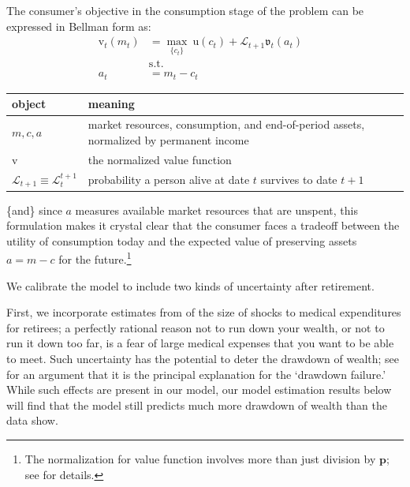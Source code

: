 \documentclass{article}
\newcommand{\uFunc}{\mathrm{u}}
\newcommand{\pLvl}{\mathbf{p}}
\newcommand{\vFunc}{\mathrm{v}}
\newcommand{\Alive}{\mathcal{L}}
\newcommand{\tranShkEmp}{\xi}
\newcommand{\cNrm}{c}
\newcommand{\RNrm}{\mathcal{R}}
\newcommand{\aNrm}{a}
\newcommand{\mNrm}{m}
\begin{document}
The consumer's objective in the consumption stage of the problem can be expressed in Bellman form as:
\begin{align}
    {\vFunc}_{t}({\mNrm}_{t}) & = \max_{\{\cNrm_{t}\}} ~ \uFunc(\cNrm_{t})+\Alive_{t+1} \mathfrak{v}_{t}(\aNrm_{t})
    \\ & \text{s.t.} &
    \\ \aNrm_{t} & = {\mNrm}_{t}-\cNrm_{t}
\end{align}

\newline
\bigskip\noindent
\begin{tabular}{p{}p{}}
\toprule
object & meaning \\
\hline
$\mNrm, \cNrm, \aNrm$ & market resources, consumption, and end-of-period assets, normalized by permanent income \\
$\vFunc$ & the normalized value function \\
$\Alive_{t+1} \equiv \Alive_{t}^{t+1}$ & probability a person alive at date $t$ survives to date $t+1$ \\
\bottomrule
\end{tabular}

\bigskip\newline
\{and\} since $\aNrm$ measures available market resources that are unspent, this formulation makes it crystal clear that the consumer faces a tradeoff between the utility of consumption today and the expected value of preserving assets $\aNrm=\mNrm -\cNrm$ for the future.\footnote{The normalization for value function involves more than just division by $\pLvl$; see \cite{BufferStockTheory} for details.}

We calibrate the model to include two kinds of uncertainty after retirement.

First, we incorporate estimates from \cite{velasquez-giraldoJMP} of the size of shocks to medical expenditures for retirees; a perfectly rational reason not to run down your wealth, or not to run it down too far, is a fear of large medical expenses that you want to be able to meet.  Such uncertainty has the potential to deter the drawdown of wealth; see \cite{ameriks2011joy} for an argument that it is the principal explanation for the `drawdown failure.'  While such effects are present in our model, our model estimation results below will find that the model still predicts much more drawdown of wealth than the data show.
\end{document}

